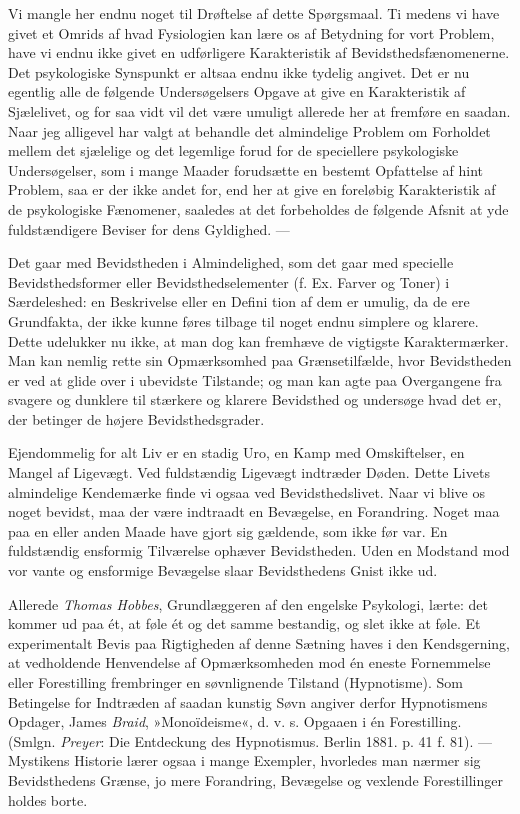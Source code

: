 \documentclass[12pt,a4paper,openany]{book}
\newcommand{\opage}[1]{\marginnote{\footnotesize\textit{[#1]}}}
\begin{document}
Vi mangle her endnu noget til Drøftelse af dette Spørgsmaal. Ti medens
vi have givet et Omrids af hvad Fysiologien kan lære os af Betydning for
vort Problem, have vi endnu ikke givet en udførligere Karakteristik af
Bevidsthedsfænomenerne. Det psykologiske Synspunkt er altsaa endnu ikke
tydelig angivet. Det er nu egentlig alle de følgende Undersøgelsers
Opgave at give en Karakteristik af Sjælelivet, og for saa vidt vil det
være umuligt allerede her at fremføre en saadan. Naar jeg alligevel har
valgt at behandle det almindelige Problem om Forholdet mellem det
sjælelige og det legemlige forud for de speciellere psykologiske
Undersøgelser, som i mange Maader forudsætte en bestemt Opfattelse af
hint Problem, saa er der ikke andet for, end her at give en foreløbig
Karakteristik af de psykologiske Fænomener, saaledes at det forbeholdes
de følgende Afsnit at yde fuldstændigere Beviser for dens Gyldighed. ---

Det gaar med Bevidstheden i Almindelighed, som det gaar med specielle
Bevidsthedsformer eller Bevidsthedselementer (f. Ex. Farver og Toner) i
Særdeleshed: en Beskrivelse eller en Defini%
\opage{55}tion af dem er umulig, da de ere Grundfakta, der ikke kunne
føres tilbage til noget endnu simplere og klarere. Dette udelukker nu
ikke, at man dog kan fremhæve de vigtigste Karaktermærker. Man kan
nemlig rette sin Opmærksomhed paa Grænsetilfælde, hvor Bevidstheden er
ved at glide over i ubevidste Tilstande; og man kan agte paa Overgangene
fra svagere og dunklere til stærkere og klarere Bevidsthed og undersøge
hvad det er, der betinger de højere Bevidsthedsgrader.

Ejendommelig for alt Liv er en stadig Uro, en Kamp med Omskiftelser, en
Mangel af Ligevægt. Ved fuldstændig Ligevægt indtræder Døden. Dette
Livets almindelige Kendemærke finde vi ogsaa ved Bevidsthedslivet. Naar
vi blive os noget bevidst, maa der være indtraadt en Bevægelse, en
Forandring. Noget maa paa en eller anden Maade have gjort sig gældende,
som ikke før var. En fuldstændig ensformig Tilværelse ophæver
Bevidstheden. Uden en Modstand mod vor vante og ensformige Bevægelse
slaar Bevidsthedens Gnist ikke ud.

Allerede \emph{Thomas Hobbes}, Grundlæggeren af den engelske Psykologi,
lærte: det kommer ud paa ét, at føle ét og det samme bestandig, og slet
ikke at føle. Et experimentalt Bevis paa Rigtigheden af denne Sætning
haves i den Kendsgerning, at vedholdende Henvendelse af Opmærksomheden
mod én eneste Fornemmelse eller Forestilling frembringer en søvnlignende
Tilstand (Hypnotisme). Som Betingelse for Indtræden af saadan kunstig
Søvn angiver derfor Hypnotismens Opdager, James \emph{Braid},
»Monoïdeisme«, d. v. s. Opgaaen i én Forestilling. (Smlgn.
\emph{Preyer}: Die Entdeckung des Hypnotismus. Berlin 1881. p. 41 f.
81). --- Mystikens Historie lærer ogsaa i mange Exempler, hvorledes man
nærmer sig Bevidsthedens Grænse, jo mere Forandring, Bevægelse og
vexlende Forestillinger holdes borte.
\end{document}
